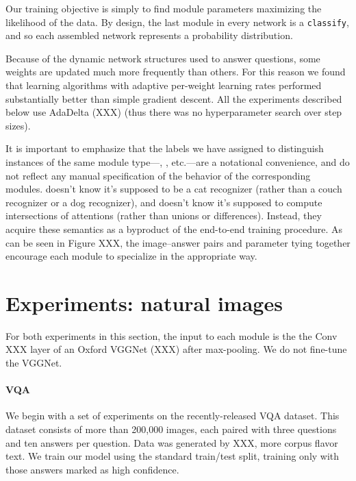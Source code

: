 \documentclass[10pt,twocolumn,letterpaper]{article}
\begin{document}
Our training objective is simply to find module parameters maximizing the
likelihood of the data. By design, the last module in every network is a
{\small\tt classify}, and so each assembled network represents a probability
distribution.

Because of the dynamic network structures used to answer questions, some weights
are updated much more frequently than others. For this reason we found that
learning algorithms with adaptive per-weight learning rates performed
substantially better than simple gradient descent. All the experiments described
below use AdaDelta (XXX) (thus there was no hyperparameter search over step
sizes).

It is important to emphasize that the labels we have assigned to distinguish
instances of the same module type---, , etc.---are a
notational convenience, and do not reflect any manual specification of the
behavior of the corresponding modules.  doesn't know it's
supposed to be a cat recognizer (rather than a couch recognizer or a dog
recognizer),
and  doesn't know it's supposed to compute intersections of
attentions (rather than unions or differences). Instead, they acquire these
semantics as a byproduct of the end-to-end training procedure. As can be seen in
Figure XXX, the image--answer pairs and parameter tying together encourage each
module to specialize in the appropriate way.



\section{Experiments: natural images}

For both experiments in this section, the input to each  module is
the the Conv XXX layer of an Oxford VGGNet (XXX) after max-pooling. We do not
fine-tune the VGGNet.

\paragraph{VQA}
We begin with a set of experiments on the recently-released VQA dataset. This
dataset consists of more than 200,000 images, each paired with three questions
and ten answers per question. Data was generated by XXX, more corpus flavor
text. We train our model using the standard train/test split, training only with
those answers marked as high confidence.
\end{document}
